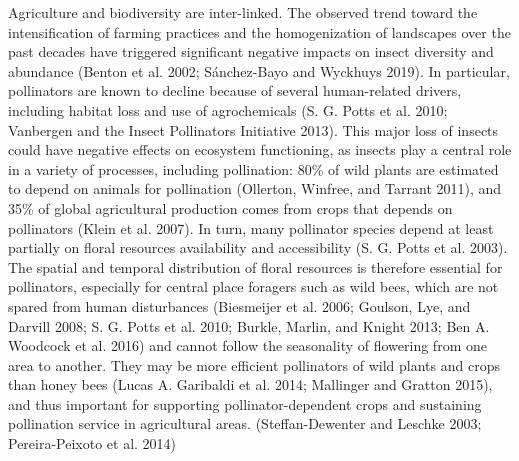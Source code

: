 \documentclass[smallextended]{svjour3}       %
\begin{document}
Agriculture and biodiversity are inter-linked. The observed trend toward
the intensification of farming practices and the homogenization of
landscapes over the past decades have triggered significant negative
impacts on insect diversity and abundance (Benton et al. 2002;
Sánchez-Bayo and Wyckhuys 2019). In particular, pollinators are known to
decline because of several human-related drivers, including habitat loss
and use of agrochemicals (S. G. Potts et al. 2010; Vanbergen and the
Insect Pollinators Initiative 2013). This major loss of insects could
have negative effects on ecosystem functioning, as insects play a
central role in a variety of processes, including pollination: 80\% of
wild plants are estimated to depend on animals for pollination
(Ollerton, Winfree, and Tarrant 2011), and 35\% of global agricultural
production comes from crops that depends on pollinators (Klein et al.
2007). In turn, many pollinator species depend at least partially on
floral resources availability and accessibility (S. G. Potts et al.
2003). The spatial and temporal distribution of floral resources is
therefore essential for pollinators, especially for central place
foragers such as wild bees, which are not spared from human disturbances
(Biesmeijer et al. 2006; Goulson, Lye, and Darvill 2008; S. G. Potts et
al. 2010; Burkle, Marlin, and Knight 2013; Ben A. Woodcock et al. 2016)
and cannot follow the seasonality of flowering from one area to another.
They may be more efficient pollinators of wild plants and crops than
honey bees (Lucas A. Garibaldi et al. 2014; Mallinger and Gratton 2015),
and thus important for supporting pollinator-dependent crops and
sustaining pollination service in agricultural areas. (Steffan-Dewenter
and Leschke 2003; Pereira-Peixoto et al. 2014)
\end{document}
